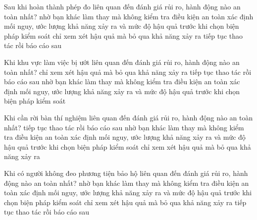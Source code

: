 \begin{ex}
Sau khi hoàn thành phép đo liên quan đến đánh giá rủi ro, hành động nào an toàn nhất?
\choice
{nhờ bạn khác làm thay mà không kiểm tra điều kiện an toàn}
{\True xác định mối nguy, ước lượng khả năng xảy ra và mức độ hậu quả trước khi chọn biện pháp kiểm soát}
{chỉ xem xét hậu quả mà bỏ qua khả năng xảy ra}
{tiếp tục thao tác rồi báo cáo sau}
\end{ex}

\begin{ex}
Khi khu vực làm việc bị ướt liên quan đến đánh giá rủi ro, hành động nào an toàn nhất?
\choice
{chỉ xem xét hậu quả mà bỏ qua khả năng xảy ra}
{tiếp tục thao tác rồi báo cáo sau}
{nhờ bạn khác làm thay mà không kiểm tra điều kiện an toàn}
{\True xác định mối nguy, ước lượng khả năng xảy ra và mức độ hậu quả trước khi chọn biện pháp kiểm soát}
\end{ex}

\begin{ex}
Khi cần rời bàn thí nghiệm liên quan đến đánh giá rủi ro, hành động nào an toàn nhất?
\choice
{tiếp tục thao tác rồi báo cáo sau}
{nhờ bạn khác làm thay mà không kiểm tra điều kiện an toàn}
{\True xác định mối nguy, ước lượng khả năng xảy ra và mức độ hậu quả trước khi chọn biện pháp kiểm soát}
{chỉ xem xét hậu quả mà bỏ qua khả năng xảy ra}
\end{ex}

\begin{ex}
Khi có người không đeo phương tiện bảo hộ liên quan đến đánh giá rủi ro, hành động nào an toàn nhất?
\choice
{nhờ bạn khác làm thay mà không kiểm tra điều kiện an toàn}
{\True xác định mối nguy, ước lượng khả năng xảy ra và mức độ hậu quả trước khi chọn biện pháp kiểm soát}
{chỉ xem xét hậu quả mà bỏ qua khả năng xảy ra}
{tiếp tục thao tác rồi báo cáo sau}
\end{ex}

